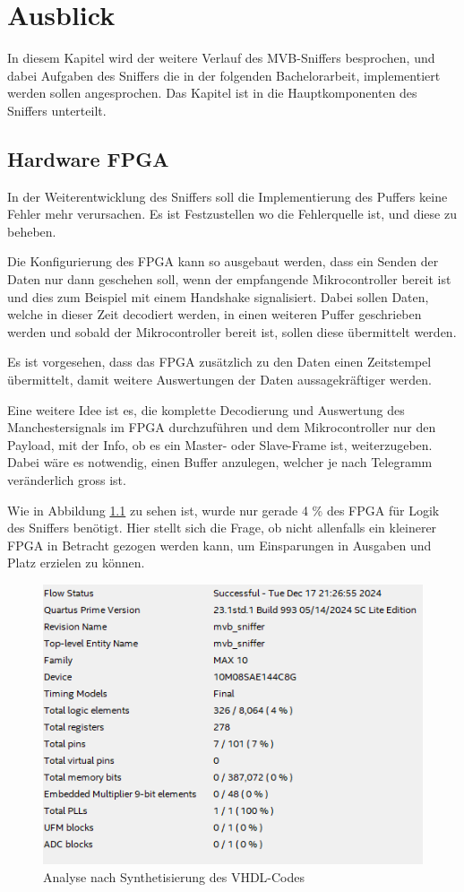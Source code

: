\chapter{Ausblick} %
\label{chapter6:Ausblick} %

In diesem Kapitel wird der weitere Verlauf des MVB-Sniffers besprochen, und dabei Aufgaben des Sniffers die in der folgenden Bachelorarbeit, implementiert werden sollen angesprochen.
Das Kapitel ist in die Hauptkomponenten des Sniffers unterteilt.


\section{Hardware FPGA}
\label{sec:AusblickHardwareFPGA}
In der Weiterentwicklung des Sniffers soll die Implementierung des Puffers keine Fehler mehr verursachen. Es ist Festzustellen wo die Fehlerquelle ist, und diese zu beheben.

Die Konfigurierung des FPGA kann so ausgebaut werden, dass ein Senden der Daten nur dann geschehen soll, wenn der empfangende Mikrocontroller bereit ist und dies zum Beispiel mit einem Handshake signalisiert. Dabei sollen Daten, welche in dieser Zeit decodiert werden, in einen weiteren Puffer geschrieben werden und sobald der Mikrocontroller bereit ist, sollen diese übermittelt werden.

Es ist vorgesehen, dass das FPGA zusätzlich zu den Daten einen Zeitstempel übermittelt, damit weitere Auswertungen der Daten aussagekräftiger werden.

Eine weitere Idee ist es, die komplette Decodierung und Auswertung des Manchestersignals im FPGA durchzuführen und dem Mikrocontroller nur den Payload, mit der Info, ob es ein Master- oder Slave-Frame ist, weiterzugeben. Dabei wäre es notwendig, einen Buffer anzulegen, welcher je nach Telegramm veränderlich gross ist. 

Wie in Abbildung \ref{fig:FPGAanalyse} zu sehen ist, wurde nur gerade 4 \% des FPGA für Logik des Sniffers benötigt. Hier stellt sich die Frage, ob nicht allenfalls ein kleinerer FPGA in Betracht gezogen werden kann, um Einsparungen in Ausgaben und Platz erzielen zu können.\\

\begin{figure}[H]
    \centering
    \includegraphics[width=0.55\linewidth]{Figures/Chap6/FPGA/quartus_analyzer.PNG}
    \caption{Analyse nach Synthetisierung des VHDL-Codes}
    \label{fig:FPGAanalyse}
\end{figure}



